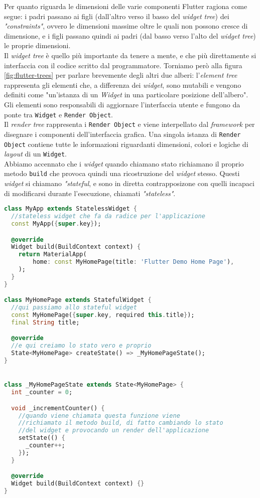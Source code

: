 Per quanto riguarda le dimensioni delle varie componenti Flutter ragiona come segue: i padri passano ai figli (dall'altro verso il basso del \textit{widget tree}) dei \textit{"constraints"}, ovvero le dimensioni massime oltre le quali non possono cresce di dimensione, e i figli passano quindi ai padri (dal basso verso l'alto del \textit{widget tree}) le proprie dimensioni.\\
Il \textit{widget tree} è quello più importante da tenere a mente, e che più direttamente si interfaccia con il codice scritto dal programmatore. Torniamo però alla figura \ref{fig:flutter-trees} per parlare brevemente degli altri due alberi: l'\textit{element tree} rappresenta gli elementi che, a differenza dei \textit{widget}, sono mutabili e vengono definiti come "un'istanza di un \textit{Widget} in una particolare posizione dell'albero". Gli elementi sono responsabili di aggiornare l'interfaccia utente e fungono da ponte tra \verb+Widget+ e \verb+Render Object+.\\
Il \textit{render tree} rappresenta i \verb+Render Object+ e viene interpellato dal \textit{framework} per disegnare i componenti dell'interfaccia grafica. Una singola istanza di \verb+Render Object+ contiene tutte le informazioni riguardanti dimensioni, colori e logiche di \textit{layout} di un \verb+Widget+.\\
Abbiamo accennato che i \textit{widget} quando chiamano stato richiamano il proprio metodo \verb+build+ che provoca quindi una ricostruzione del \textit{widget} stesso. Questi \textit{widget} si chiamano \textit{"stateful}, e sono in diretta contrapposizone con quelli incapaci di modificarsi durante l'esecuzione, chiamati \textit{"stateless"}. 

\begin{lstlisting}[language=dart, label={lst:stateful_widget}, caption={Creazione \textit{stateless widget}}]
class MyApp extends StatelessWidget {
  //stateless widget che fa da radice per l'applicazione
  const MyApp({super.key});

  @override
  Widget build(BuildContext context) {
    return MaterialApp(
        home: const MyHomePage(title: 'Flutter Demo Home Page'),
    );
  }
}

class MyHomePage extends StatefulWidget {
  //qui passiamo allo stateful widget
  const MyHomePage({super.key, required this.title});
  final String title;

  @override
  //e qui creiamo lo stato vero e proprio
  State<MyHomePage> createState() => _MyHomePageState();
}


class _MyHomePageState extends State<MyHomePage> {
  int _counter = 0;

  void _incrementCounter() {
    //quando viene chiamata questa funzione viene
    //richiamato il metodo build, di fatto cambiando lo stato 
    //del widget e provocando un render dell'applicazione
    setState(() {
      _counter++;
    });
  }

  @override
  Widget build(BuildContext context) {}
}
\end{lstlisting}

